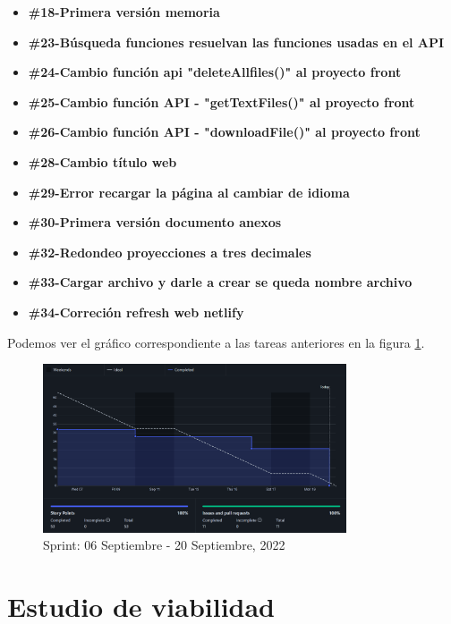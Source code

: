 \begin{itemize}
    \item \textbf{\#18-Primera versión memoria}
    \item \textbf{\#23-Búsqueda funciones resuelvan las funciones usadas en el API}
    \item \textbf{\#24-Cambio función api "deleteAllfiles()" al proyecto front}
    \item \textbf{\#25-Cambio función API - "getTextFiles()" al proyecto front}
    \item \textbf{\#26-Cambio función API - "downloadFile()" al proyecto front}
    \item \textbf{\#28-Cambio título web}
    \item \textbf{\#29-Error recargar la página al cambiar de idioma}
    \item \textbf{\#30-Primera versión documento anexos}
    \item \textbf{\#32-Redondeo proyecciones a tres decimales}
    \item \textbf{\#33-Cargar archivo y darle a crear se queda nombre archivo}
    \item \textbf{\#34-Correción refresh web netlify}
\end{itemize}

Podemos ver el gráfico correspondiente a las tareas anteriores en la figura \ref{fig:sprint_06_20_sep}.

\begin{figure}[h!] 
\centering
    \includegraphics[width=0.8\textwidth]{img/sprint_06_20_sep.PNG}
\caption{Sprint: 06 Septiembre - 20 Septiembre, 2022}
\label{fig:sprint_06_20_sep}
\end{figure}

\section{Estudio de viabilidad}

